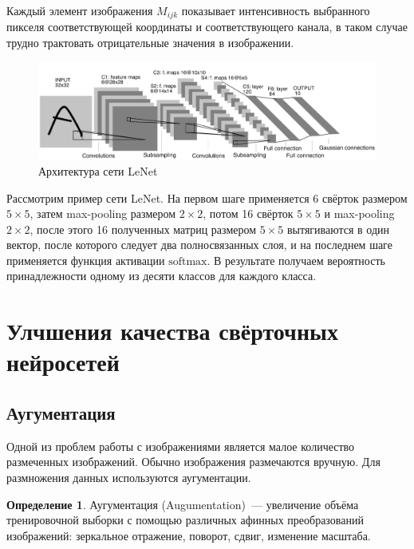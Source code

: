 \documentclass{article}
\theoremstyle{definition}
\newtheorem{definition}{Определение}
\theoremstyle{theorem}
\theoremstyle{remark}
\theoremstyle{theorem}
\theoremstyle{example}
\theoremstyle{theorem}
\theoremstyle{theorem}
\theoremstyle{theorem}
\theoremstyle{theorem}
\begin{document}
		Каждый элемент изображения $M_{ijk}$ показывает интенсивность выбранного пикселя соответствующей координаты и соответствующего канала, в таком случае трудно трактовать отрицательные значения в изображении.
		\newpage
		\begin{figure}[h!]
			\includegraphics[width=\textwidth]{img/lesnet.png}\caption{Архитектура сети LeNet}
		\end{figure}
		Рассмотрим пример сети LeNet. На первом шаге применяется 6 свёрток размером $5\times5$, затем max-pooling размером $2\times2$, потом 16 свёрток $5\times 5$  и max-pooling $2\times2$, после этого 16 полученных матриц размером $5\times5$ вытягиваются в один вектор, после которого следует два полносвязанных слоя, и на последнем шаге применяется функция активации $\mathrm{softmax}$. В результате получаем вероятность принадлежности одному из десяти классов для каждого класса.
		\section{Улчшения качества свёрточных нейросетей} 
			\subsection{Аугументация}
				Одной из проблем работы с изображениями является малое количество размеченных изображений. Обычно изображения размечаются вручную. Для размножения данных используются аугументации.
				
		\begin{definition}
			Аугументация (Augumentation)~--- увеличение объёма тренировочной выборки с помощью различных афинных преобразований изображений: зеркальное отражение, поворот, сдвиг, изменение масштаба.
		\end{definition}
		
\end{document}
